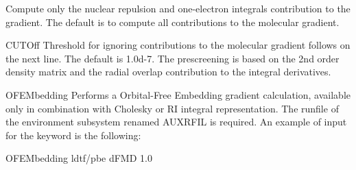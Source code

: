 \begin{keywordlist}
Compute only the nuclear repulsion and one-electron integrals
contribution to the gradient. The default is to compute all
contributions to the molecular gradient.
\item[CUTOff]
Threshold for ignoring contributions to the molecular gradient
follows on the next line. The default is 1.0d-{}7. The prescreening
is based on the 2nd order density matrix and the radial
overlap contribution to the integral derivatives.
\item[OFEMbedding]
Performs a Orbital-Free Embedding gradient calculation, available only in combination with Cholesky or RI integral representation.
The runfile of the environment subsystem renamed AUXRFIL is required.
An example of input for the keyword  is the following:
\begin{inputlisting}

OFEMbedding
 ldtf/pbe
dFMD
 1.0


\end{inputlisting}
\end{keywordlist}
